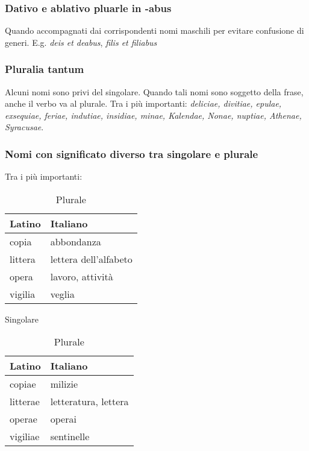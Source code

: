\subsubsection*{Dativo e ablativo pluarle in -abus}
Quando accompagnati dai corrispondenti nomi maschili per evitare confusione di generi. E.g. \textit{deis et deabus}, \textit{filis et filiabus}

\subsubsection*{Pluralia tantum}
Alcuni nomi sono privi del singolare. Quando tali nomi sono soggetto della frase, anche il verbo va al plurale.
Tra i pi\`u importanti:
\textit{deliciae, divitiae, epulae, exsequiae, feriae, indutiae, insidiae, minae, Kalendae, Nonae,
nuptiae, Athenae, Syracusae}.

\subsubsection*{Nomi con significato diverso tra singolare e plurale}
Tra i pi\`u importanti:
\begin{table}[h!]
    \begin{minipage}{.4\linewidth}
        \centering
        \begin{tabular}{|l|l|}
            \hline
            \textbf{Latino} & \textbf{Italiano} \\
            \hline
            copia & abbondanza \\
            \hline
            littera & lettera dell'alfabeto\\
            \hline
            opera & lavoro, attivit\`a \\
            \hline
            vigilia & veglia \\
            \hline
        \end{tabular}
        \caption{Singolare}
    \end{minipage}
    \hfill
    \begin{minipage}{.4\linewidth}
        \centering
        \begin{tabular}{|l|l|}
            \hline
            \textbf{Latino} & \textbf{Italiano} \\
            \hline
            copiae & milizie \\
            \hline
            litterae & letteratura, lettera\\
            \hline
            operae & operai \\
            \hline
            vigiliae & sentinelle \\
            \hline
        \end{tabular}
        \caption{Plurale}
    \end{minipage}
\end{table}
\clearpage
